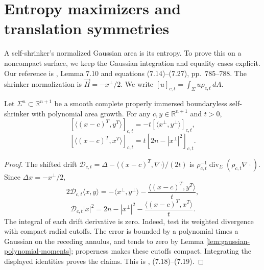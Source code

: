 \chapter{Entropy maximizers and translation symmetries}\label{sec:shrinker-entropy}
A self-shrinker's normalized Gaussian area is its entropy. To prove this on a noncompact surface, we keep the Gaussian integration and equality cases explicit. Our reference is \cite{CM12}, Lemma 7.10 and equations (7.14)--(7.27), pp.~785--788. The shrinker normalization is $\vec H=-x^\perp/2$. We write $[u]_{c,t}=\int_\Sigma u\rho_{c,t}\,dA$.

\begin{lemma}\label{lem:shrinker-shifted-divergence}
Let $\Sigma^n\subset\mathbb R^{n+1}$ be a smooth complete properly immersed boundaryless self-shrinker with polynomial area growth. For any $c,y\in\mathbb R^{n+1}$ and $t>0$,
\[
 [\langle(x-c)^T,y^T\rangle]_{c,t}
 =-t[\langle x^\perp,y^\perp\rangle]_{c,t},
\]
\[
 [\langle(x-c)^T,x^T\rangle]_{c,t}
 =t[2n-|x^\perp|^2]_{c,t}.
\]
\end{lemma}
\begin{proof}
The shifted drift $\mathcal D_{c,t}=\Delta-\langle(x-c)^T,\nabla\cdot\rangle/(2t)$ is $\rho_{c,t}^{-1}\operatorname{div}_\Sigma(\rho_{c,t}\nabla\cdot)$. Since $\Delta x=-x^\perp/2$,
\[
 2\mathcal D_{c,t}\langle x,y\rangle
 =-\langle x^\perp,y^\perp\rangle-\frac{\langle(x-c)^T,y^T\rangle}{t},
\]
\[
 \mathcal D_{c,t}|x|^2
 =2n-|x^\perp|^2-\frac{\langle(x-c)^T,x^T\rangle}{t}.
\]
The integral of each drift derivative is zero. Indeed, test its weighted divergence with compact radial cutoffs. The error is bounded by a polynomial times a Gaussian on the receding annulus, and tends to zero by Lemma \ref{lem:gaussian-polynomial-moments}; properness makes these cutoffs compact. Integrating the displayed identities proves the claims. This is \cite{CM12}, (7.18)--(7.19).
\end{proof}

